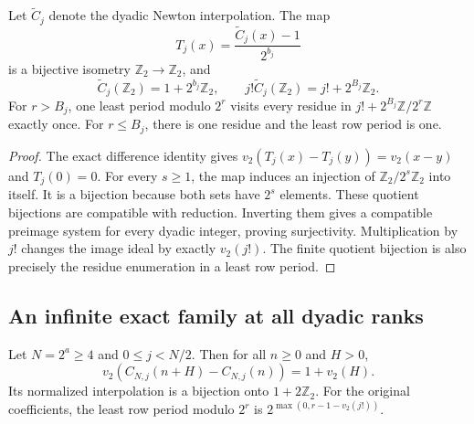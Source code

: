 \begin{corollary}
\label{cor:four-exact-images}
Let $\widetilde C_j$ denote the dyadic Newton interpolation.
The map
\[
 T_j(x)=\frac{\widetilde C_j(x)-1}{2^{b_j}}
\]
is a bijective isometry $\mathbb Z_2\to\mathbb Z_2$, and
\begin{equation}
 \widetilde C_j(\mathbb Z_2)=1+2^{b_j}\mathbb Z_2,
 \qquad j!\widetilde C_j(\mathbb Z_2)=j!+2^{B_j}\mathbb Z_2.
 \label{eq:four-interpolation-images-final}
\end{equation}
For $r>B_j$, one least period modulo $2^r$ visits every residue in
$j!+2^{B_j}\mathbb Z/2^r\mathbb Z$ exactly once. For $r\leq B_j$,
there is one residue and the least row period is one.
\end{corollary}

\begin{proof}
The exact difference identity gives
$v_2(T_j(x)-T_j(y))=v_2(x-y)$ and $T_j(0)=0$.
For every $s\geq1$, the map induces an injection of
$\mathbb Z_2/2^s\mathbb Z_2$ into itself. It is a bijection because
both sets have $2^s$ elements. These quotient bijections are compatible
with reduction. Inverting them gives a compatible preimage system for
every dyadic integer, proving surjectivity. Multiplication by $j!$
changes the image ideal by exactly $v_2(j!)$.
The finite quotient bijection is also precisely the residue enumeration
in a least row period.
\end{proof}

\subsection{An infinite exact family at all dyadic ranks}

\begin{theorem}
\label{thm:lower-half-all-dyadic-isometry}
Let $N=2^a\geq4$ and $0\leq j<N/2$. Then for all $n\geq0$ and $H>0$,
\begin{equation}
 v_2(C_{N,j}(n+H)-C_{N,j}(n))=1+v_2(H).
 \label{eq:lower-half-all-dyadic-exact}
\end{equation}
Its normalized interpolation is a bijection onto $1+2\mathbb Z_2$.
For the original coefficients, the least row period modulo $2^r$ is
$2^{\max(0,r-1-v_2(j!))}$.
\end{theorem}

